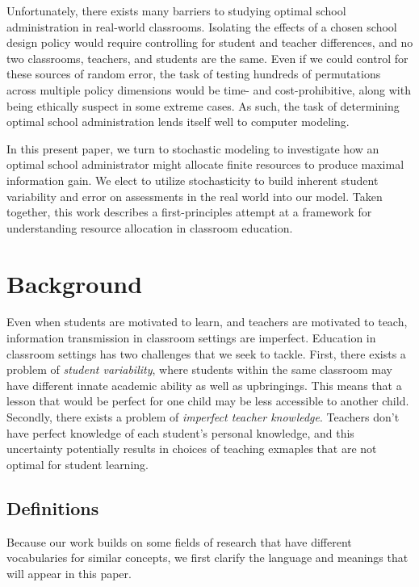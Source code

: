 \documentclass[10pt, letterpaper]{article}
\begin{document}
Unfortunately, there exists many barriers to studying optimal school
administration in real-world classrooms. Isolating the effects of a
chosen school design policy would require controlling for student and
teacher differences, and no two classrooms, teachers, and students are
the same. Even if we could control for these sources of random error,
the task of testing hundreds of permutations across multiple policy
dimensions would be time- and cost-prohibitive, along with being
ethically suspect in some extreme cases. As such, the task of
determining optimal school administration lends itself well to computer
modeling.

In this present paper, we turn to stochastic modeling to investigate how
an optimal school administrator might allocate finite resources to
produce maximal information gain. We elect to utilize stochasticity to
build inherent student variability and error on assessments in the real
world into our model. Taken together, this work describes a
first-principles attempt at a framework for understanding resource
allocation in classroom education.

\section{Background}\label{background}

Even when students are motivated to learn, and teachers are motivated to
teach, information transmission in classroom settings are imperfect.
Education in classroom settings has two challenges that we seek to
tackle. First, there exists a problem of \emph{student variability},
where students within the same classroom may have different innate
academic ability as well as upbringings. This means that a lesson that
would be perfect for one child may be less accessible to another child.
Secondly, there exists a problem of \emph{imperfect teacher knowledge}.
Teachers don't have perfect knowledge of each student's personal
knowledge, and this uncertainty potentially results in choices of
teaching exmaples that are not optimal for student learning.

\subsection{Definitions}\label{definitions}

Because our work builds on some fields of research that have different
vocabularies for similar concepts, we first clarify the language and
meanings that will appear in this paper.
\end{document}
